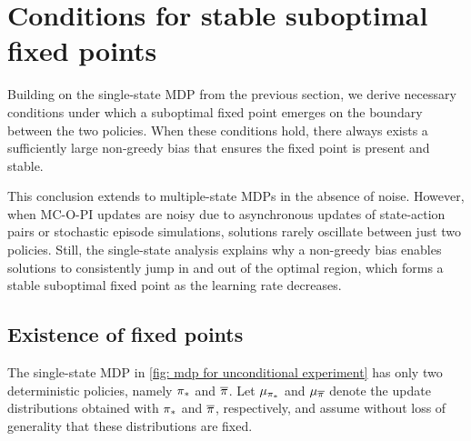 \section{Conditions for stable suboptimal fixed points}
\label{sec: bifurcation}


Building on the single-state MDP from the previous section, we derive necessary conditions under which a suboptimal fixed point emerges on the boundary between the two policies.
When these conditions hold, there always exists a sufficiently large non-greedy bias that ensures the fixed point is present and stable.

This conclusion extends to multiple-state MDPs in the absence of noise.
However, when MC-O-PI updates are noisy due to asynchronous updates of state-action pairs or stochastic episode simulations, solutions rarely oscillate between just two policies.
Still, the single-state analysis explains why a non-greedy bias enables solutions to consistently jump in and out of the optimal region, which forms a stable suboptimal fixed point as the learning rate decreases.




\subsection{Existence of fixed points}


The single-state MDP in \autoref{fig: mdp for unconditional experiment} has only two deterministic policies, namely ${\pi}_*$ and $\overline{\pi}$.
Let $\mu_{{\pi}_*}$ and $\mu_{\overline{\pi}}$ denote the update distributions obtained with ${\pi}_*$ and $\overline{\pi}$, respectively, and assume without loss of generality that these distributions are fixed.

